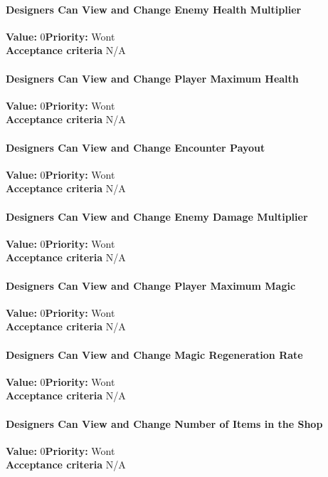 \paragraph{Designers Can View and Change Enemy Health Multiplier}
\textbf{Value:} 0\quad \textbf{Priority:} Wont\\
\textbf{Acceptance criteria} N/A

\paragraph{Designers Can View and Change Player Maximum Health}
\textbf{Value:} 0\quad \textbf{Priority:} Wont\\
\textbf{Acceptance criteria} N/A

\paragraph{Designers Can View and Change Encounter Payout}
\textbf{Value:} 0\quad \textbf{Priority:} Wont\\
\textbf{Acceptance criteria} N/A

\paragraph{Designers Can View and Change Enemy Damage Multiplier}
\textbf{Value:} 0\quad \textbf{Priority:} Wont\\
\textbf{Acceptance criteria} N/A

\paragraph{Designers Can View and Change Player Maximum Magic}
\textbf{Value:} 0\quad \textbf{Priority:} Wont\\
\textbf{Acceptance criteria} N/A

\paragraph{Designers Can View and Change Magic Regeneration Rate}
\textbf{Value:} 0\quad \textbf{Priority:} Wont\\
\textbf{Acceptance criteria} N/A

\paragraph{Designers Can View and Change Number of Items in the Shop}
\textbf{Value:} 0\quad \textbf{Priority:} Wont\\
\textbf{Acceptance criteria} N/A

